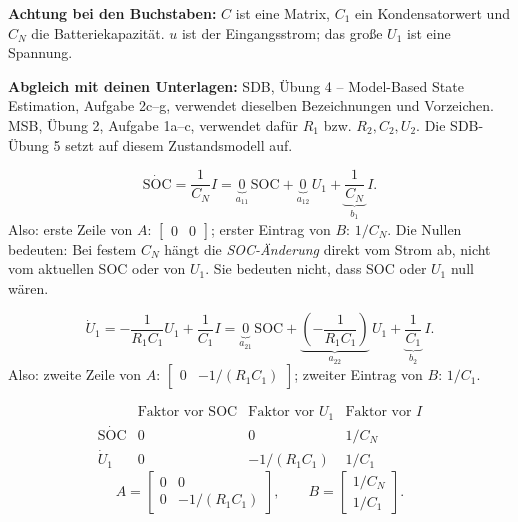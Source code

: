 \textbf{Achtung bei den Buchstaben:} $C$ ist eine Matrix, $C_1$ ein Kondensatorwert und $C_N$ die Batteriekapazität. $u$ ist der Eingangsstrom; das große $U_1$ ist eine Spannung.

{\small\textbf{Abgleich mit deinen Unterlagen:} SDB, Übung 4 -- Model-Based State Estimation, Aufgabe 2c--g, verwendet dieselben Bezeichnungen und Vorzeichen. MSB, Übung 2, Aufgabe 1a--c, verwendet dafür $R_1$ bzw. $R_2,C_2,U_2$. Die SDB-Übung 5 setzt auf diesem Zustandsmodell auf.}


\[
\dot{\mathrm{SOC}}=\frac{1}{C_N}I
=\underbrace{0}_{a_{11}}\,\mathrm{SOC}
+\underbrace{0}_{a_{12}}\,U_1
+\underbrace{\frac{1}{C_N}}_{b_1}\,I.
\]
Also: erste Zeile von $A$: $\begin{bmatrix}0&0\end{bmatrix}$; erster Eintrag von $B$: $1/C_N$.
Die Nullen bedeuten: Bei festem $C_N$ hängt die \emph{SOC-Änderung} direkt vom Strom ab, nicht vom aktuellen SOC oder von $U_1$. Sie bedeuten nicht, dass SOC oder $U_1$ null wären.

\[
\dot U_1=-\frac{1}{R_1C_1}U_1+\frac{1}{C_1}I
=\underbrace{0}_{a_{21}}\,\mathrm{SOC}
+\underbrace{\left(-\frac{1}{R_1C_1}\right)}_{a_{22}}\,U_1
+\underbrace{\frac{1}{C_1}}_{b_2}\,I.
\]
Also: zweite Zeile von $A$: $\begin{bmatrix}0&-1/(R_1C_1)\end{bmatrix}$; zweiter Eintrag von $B$: $1/C_1$.

\[
\begin{array}{c|cc|c}
 &\text{Faktor vor SOC}&\text{Faktor vor }U_1&\text{Faktor vor }I\\\hline
\dot{\mathrm{SOC}}&0&0&1/C_N\\[5pt]
\dot U_1&0&-1/(R_1C_1)&1/C_1
\end{array}
\]
\[
\boxed{A=\begin{bmatrix}0&0\\[3pt]0&-1/(R_1C_1)\end{bmatrix}},
\qquad
\boxed{B=\begin{bmatrix}1/C_N\\[3pt]1/C_1\end{bmatrix}}.
\]

